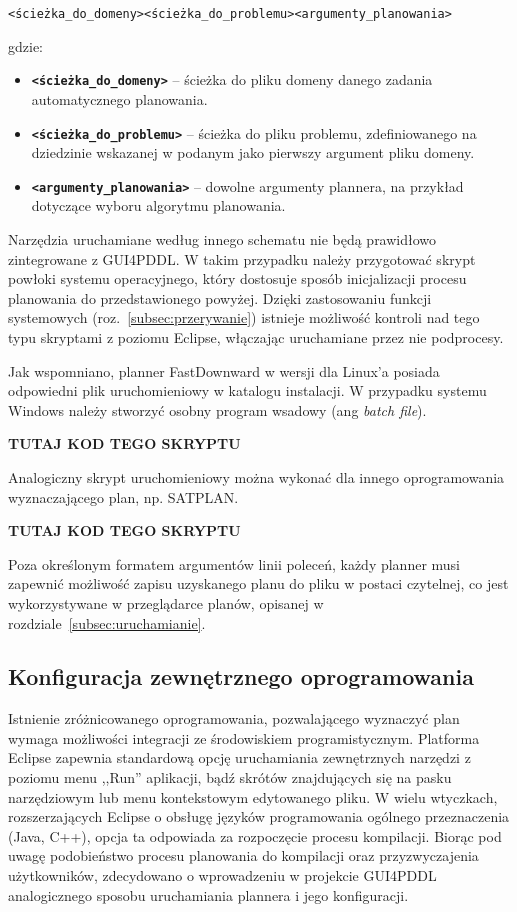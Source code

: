 \noindent
\centerline{\texttt{<ścieżka\_do\_domeny>}\textvisiblespace\texttt{<ścieżka\_do\_problemu>}\textvisiblespace\texttt{<argumenty\_planowania>}}


\noindent
gdzie:
\begin{itemize}
\item \textbf{\texttt{<ścieżka\_do\_domeny>}} -- ścieżka do pliku domeny danego zadania automatycznego planowania.
\item \textbf{\texttt{<ścieżka\_do\_problemu>}} -- ścieżka do pliku problemu, zdefiniowanego na dziedzinie wskazanej w podanym jako pierwszy argument pliku domeny.
\item \textbf{\texttt{<argumenty\_planowania>}} -- dowolne argumenty plannera, na przykład dotyczące wyboru algorytmu planowania.
\end{itemize}
Narzędzia uruchamiane według innego schematu nie będą prawidłowo zintegrowane z GUI4PDDL. W takim przypadku należy przygotować skrypt powłoki systemu operacyjnego, który dostosuje sposób inicjalizacji procesu planowania do przedstawionego powyżej. Dzięki zastosowaniu funkcji systemowych (roz.~\ref{subsec:przerywanie}) istnieje możliwość kontroli nad tego typu skryptami z poziomu Eclipse, włączając uruchamiane przez nie podprocesy.

Jak wspomniano, planner FastDownward w wersji dla Linux'a posiada odpowiedni plik uruchomieniowy w katalogu  instalacji. W przypadku systemu Windows należy stworzyć osobny program wsadowy (ang \textit{batch file}).

\textbf{TUTAJ KOD TEGO SKRYPTU}

Analogiczny skrypt uruchomieniowy można wykonać dla innego oprogramowania wyznaczającego plan, np. SATPLAN.

\textbf{TUTAJ KOD TEGO SKRYPTU}

Poza określonym formatem argumentów linii poleceń, każdy planner musi zapewnić możliwość zapisu uzyskanego planu do pliku w postaci czytelnej, co jest wykorzystywane w przeglądarce planów, opisanej w rozdziale~\ref{subsec:uruchamianie}.

\subsection{Konfiguracja zewnętrznego oprogramowania}
\label{subsec:konfiguracja}
Istnienie zróżnicowanego oprogramowania, pozwalającego wyznaczyć plan wymaga możliwości integracji ze środowiskiem programistycznym. Platforma Eclipse zapewnia standardową opcję uruchamiania zewnętrznych narzędzi z poziomu menu ,,Run'' aplikacji, bądź skrótów znajdujących się na pasku narzędziowym lub menu kontekstowym edytowanego pliku. W wielu wtyczkach, rozszerzających Eclipse o obsługę języków programowania ogólnego przeznaczenia (Java, C++), opcja ta odpowiada za rozpoczęcie procesu kompilacji. Biorąc pod uwagę podobieństwo procesu planowania do kompilacji oraz przyzwyczajenia użytkowników, zdecydowano o wprowadzeniu w projekcie GUI4PDDL analogicznego sposobu uruchamiania plannera i jego konfiguracji.

